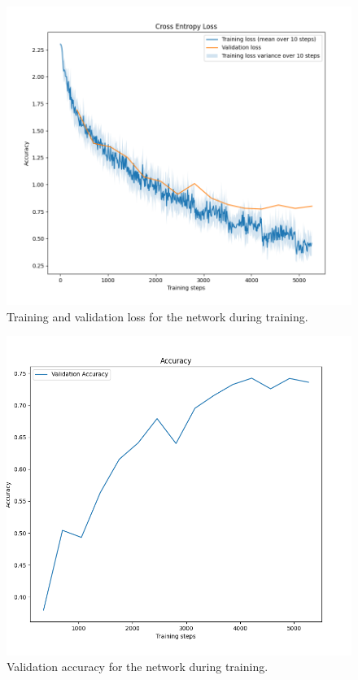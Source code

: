 \documentclass{article}
\begin{document}
\begin{figure}[H]
    \centering
    \includegraphics[width = \textwidth]{Assignments/Assignment_3/plots/ass_3_task2_loss.png}
    \caption{Training and validation loss for the network during training.}
    \label{fig:task2_loss}
\end{figure}

\begin{figure}[H]
    \centering
    \includegraphics[width = \textwidth]{Assignments/Assignment_3/plots/ass_3task_2_acc.png}
    \caption{Validation accuracy for the network during training.}
    \label{fig:task2_acc}
\end{figure}
\end{document}
